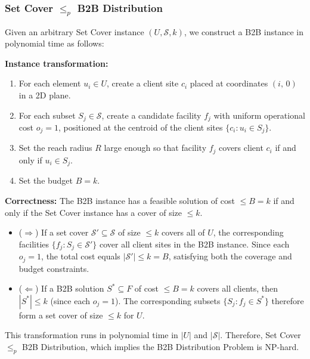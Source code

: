 \documentclass[letterpaper]{article}
\begin{document}
\subsubsection{Set Cover $\leq_p$ B2B Distribution}
Given an arbitrary Set Cover instance $(U, \mathcal{S}, k)$, we construct a B2B instance in polynomial time as follows:

\textbf{Instance transformation:}
\begin{enumerate}
    \item For each element $u_i \in U$, create a client site $c_i$ placed at coordinates $(i,\, 0)$ in a 2D plane.
    \item For each subset $S_j \in \mathcal{S}$, create a candidate facility $f_j$ with uniform operational cost $o_j = 1$, positioned at the centroid of the client sites $\{c_i : u_i \in S_j\}$.
    \item Set the reach radius $R$ large enough so that facility $f_j$ covers client $c_i$ if and only if $u_i \in S_j$.
    \item Set the budget $B = k$.
\end{enumerate}

\textbf{Correctness:} The B2B instance has a feasible solution of cost $\leq B = k$ if and only if the Set Cover instance has a cover of size $\leq k$.
\begin{itemize}
    \item ($\Rightarrow$) If a set cover $\mathcal{S}' \subseteq \mathcal{S}$ of size $\leq k$ covers all of $U$, the corresponding facilities $\{f_j : S_j \in \mathcal{S}'\}$ cover all client sites in the B2B instance. Since each $o_j = 1$, the total cost equals $|\mathcal{S}'| \leq k = B$, satisfying both the coverage and budget constraints.
    \item ($\Leftarrow$) If a B2B solution $S^* \subseteq F$ of cost $\leq B = k$ covers all clients, then $|S^*| \leq k$ (since each $o_j = 1$). The corresponding subsets $\{S_j : f_j \in S^*\}$ therefore form a set cover of size $\leq k$ for $U$.
\end{itemize}

This transformation runs in polynomial time in $|U|$ and $|\mathcal{S}|$. Therefore, Set Cover $\leq_p$ B2B Distribution, which implies the B2B Distribution Problem is NP-hard.
\end{document}
